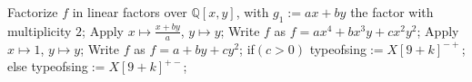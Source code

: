 \documentclass{amsproc}
\begin{document}
\begin{itemize}
\phantom{}\quad Factorize $f$ in linear factors over $\mathbb Q[x,y]$, with $g_1:=ax+by$ the factor\newline
\phantom{}\quad with multiplicity $2$;\newline
\phantom{}\quad Apply $x\mapsto\frac{x+by}{a}$, $y\mapsto y$;\newline
\phantom{}\quad Write $f$ as $f=ax^4+bx^3y+cx^2y^2$;\newline
\phantom{}\quad Apply $x\mapsto 1$, $y\mapsto y$;\newline
\phantom{}\quad Write $f$ as $f=a+by+cy^2$;\newline
\phantom{}\quad if$(c>0)$\newline
\phantom{}\quad\quad typeofsing$:= X[9+k]^{-+}$;\newline
\phantom{}\quad else\newline
\phantom{}\quad\quad typeofsing$:=X[9+k]^{+-}$;
\end{itemize}
\end{document}

